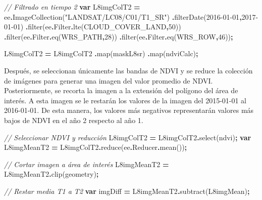 \documentclass[
  12pt,
  letterpaper,
  twoside]{book}
\newenvironment{Shaded}{\begin{snugshade}}{\end{snugshade}}
\newcommand{\AttributeTok}[1]{\textcolor[rgb]{0.77,0.63,0.00}{#1}}
\newcommand{\CommentTok}[1]{\textcolor[rgb]{0.56,0.35,0.01}{\textit{#1}}}
\newcommand{\DecValTok}[1]{\textcolor[rgb]{0.00,0.00,0.81}{#1}}
\newcommand{\FunctionTok}[1]{\textcolor[rgb]{0.00,0.00,0.00}{#1}}
\newcommand{\KeywordTok}[1]{\textcolor[rgb]{0.13,0.29,0.53}{\textbf{#1}}}
\newcommand{\NormalTok}[1]{#1}
\newcommand{\OperatorTok}[1]{\textcolor[rgb]{0.81,0.36,0.00}{\textbf{#1}}}
\newcommand{\StringTok}[1]{\textcolor[rgb]{0.31,0.60,0.02}{#1}}
\begin{document}
\begin{Shaded}
\begin{Highlighting}[]
\CommentTok{// Filtrado en tiempo 2}
\KeywordTok{var}\NormalTok{ L8imgColT2 }\OperatorTok{=}\NormalTok{ ee}\OperatorTok{.}\FunctionTok{ImageCollection}\NormalTok{(}\StringTok{"LANDSAT/LC08/C01/T1\_SR"}\NormalTok{)}
  \OperatorTok{.}\FunctionTok{filterDate}\NormalTok{(}\StringTok{\textquotesingle{}2016{-}01{-}01\textquotesingle{}}\OperatorTok{,}\StringTok{\textquotesingle{}2017{-}01{-}01\textquotesingle{}}\NormalTok{)}
  \OperatorTok{.}\FunctionTok{filter}\NormalTok{(ee}\OperatorTok{.}\AttributeTok{Filter}\OperatorTok{.}\FunctionTok{lte}\NormalTok{(}\StringTok{\textquotesingle{}CLOUD\_COVER\_LAND\textquotesingle{}}\OperatorTok{,}\DecValTok{50}\NormalTok{))}
  \OperatorTok{.}\FunctionTok{filter}\NormalTok{(ee}\OperatorTok{.}\AttributeTok{Filter}\OperatorTok{.}\FunctionTok{eq}\NormalTok{(}\StringTok{\textquotesingle{}WRS\_PATH\textquotesingle{}}\OperatorTok{,}\DecValTok{28}\NormalTok{))}
  \OperatorTok{.}\FunctionTok{filter}\NormalTok{(ee}\OperatorTok{.}\AttributeTok{Filter}\OperatorTok{.}\FunctionTok{eq}\NormalTok{(}\StringTok{\textquotesingle{}WRS\_ROW\textquotesingle{}}\OperatorTok{,}\DecValTok{46}\NormalTok{))}\OperatorTok{;}

\NormalTok{L8imgColT2 }\OperatorTok{=}\NormalTok{ L8imgColT2}
  \OperatorTok{.}\FunctionTok{map}\NormalTok{(maskL8sr)}
  \OperatorTok{.}\FunctionTok{map}\NormalTok{(ndviCalc)}\OperatorTok{;}
\end{Highlighting}
\end{Shaded}

Después, se seleccionan únicamente las bandas de NDVI y se reduce la colección de imágenes para generar una imagen del valor promedio de NDVI. Posteriormente, se recorta la imagen a la extensión del polígono del área de interés. A esta imagen se le restarán los valores de la imagen del 2015-01-01 al 2016-01-01. De esta manera, los valores más negativos representarán valores más bajos de NDVI en el año 2 respecto al año 1.

\begin{Shaded}
\begin{Highlighting}[]
\CommentTok{// Seleccionar NDVI y reducción}
\NormalTok{L8imgColT2 }\OperatorTok{=}\NormalTok{ L8imgColT2}\OperatorTok{.}\FunctionTok{select}\NormalTok{(}\StringTok{\textquotesingle{}ndvi\textquotesingle{}}\NormalTok{)}\OperatorTok{;}
\KeywordTok{var}\NormalTok{ L8imgMeanT2 }\OperatorTok{=}\NormalTok{ L8imgColT2}\OperatorTok{.}\FunctionTok{reduce}\NormalTok{(ee}\OperatorTok{.}\AttributeTok{Reducer}\OperatorTok{.}\FunctionTok{mean}\NormalTok{())}\OperatorTok{;}

\CommentTok{// Cortar imagen a área de interés}
\NormalTok{L8imgMeanT2 }\OperatorTok{=}\NormalTok{ L8imgMeanT2}\OperatorTok{.}\FunctionTok{clip}\NormalTok{(geometry)}\OperatorTok{;}

\CommentTok{// Restar media T1 a T2}
\KeywordTok{var}\NormalTok{ imgDiff }\OperatorTok{=}\NormalTok{ L8imgMeanT2}\OperatorTok{.}\FunctionTok{subtract}\NormalTok{(L8imgMean)}\OperatorTok{;}  
\end{Highlighting}
\end{Shaded}
\end{document}
